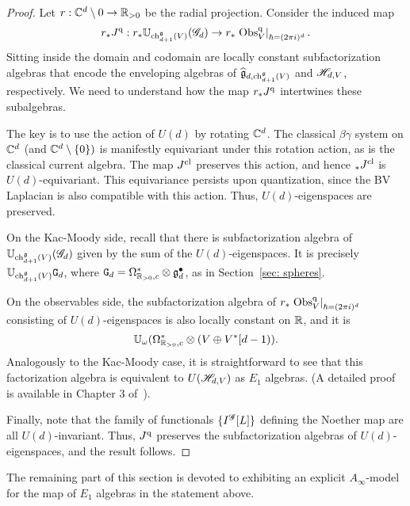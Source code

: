 \begin{proof}
Let $r : \mathbb C^d \setminus 0 \to \mathbb R_{>0}$ be the radial projection. 
Consider the induced map
\[
r_* J^{\rm q} :  r_* \mathbb U_{{\rm ch}_{d+1}^\mathfrak g(V)} (\mathscr G_d) \to  r_* \left. {\rm Obs}^{\rm q}_V \right|_{\hbar = (2\pi i)^d}  .
\]
Sitting inside the domain and codomain are locally constant subfactorization algebras that encode the enveloping algebras of $\widehat{\mathfrak g}_{d,{\rm ch}^\mathfrak g_{d+1}(V)}$ and $\mathscr H_{d,V}$, respectively.
We need to understand how the map $r_* J^{\rm q}$ intertwines these subalgebras.

The key is to use the action of $U(d)$ by rotating $\mathbb C^d$.
The classical $\beta\gamma$ system on $\mathbb C^d$ (and $\mathbb C^d \setminus \{0\})$ is manifestly equivariant under this rotation action, as is the classical current algebra.
The map $J^{\rm cl}$ preserves this action, and hence $_* J^{\rm cl}$ is $U(d)$-equivariant.
This equivariance persists upon quantization, since the BV Laplacian is also compatible with this action. 
Thus, $U(d)$-eigenspaces are preserved.

On the Kac-Moody side, recall that there is subfactorization algebra of $\mathbb U_{{\rm ch}_{d+1}^\mathfrak g(V)} (\mathscr G_d)$ given by the sum of the $U(d)$-eigenspaces. 
It is precisely $\mathbb U_{{\rm ch}_{d+1}^\mathfrak g(V)} \mathtt{G}_d$, where $\mathtt{G}_d = \Omega^*_{\mathbb R_{>0},c} \otimes \mathfrak g^\bullet_d$, as in Section~\ref{sec: spheres}.

On the observables side, the subfactorization algebra of $r_* \left. {\rm Obs}^{\rm q}_V \right|_{\hbar = (2\pi i)^d}$ consisting of $U(d)$-eigenspaces is also locally constant on $\mathbb R$,
and it is 
\[
\mathbb U_\omega (\Omega^*_{\mathbb R_{>0},c} \otimes (V \oplus V^*[d-1)).
\]
Analogously to the Kac-Moody case, it is straightforward to see that this factorization algebra is equivalent to $U(\mathscr H_{d,V})$ as $E_1$ algebras.
(A detailed proof is available in Chapter 3 of~\cite{BWthesis}).

Finally, note that the family of functionals $\{I^{\mathscr G}[L]\}$ defining the Noether map are all $U(d)$-invariant.
Thus, $J^{\rm q}$ preserves the subfactorization algebras of $U(d)$-eigenspaces, and the result follows.
\end{proof}

The remaining part of this section is devoted to exhibiting an explicit $A_\infty$-model for the map of $E_1$ algebras in the statement above.

